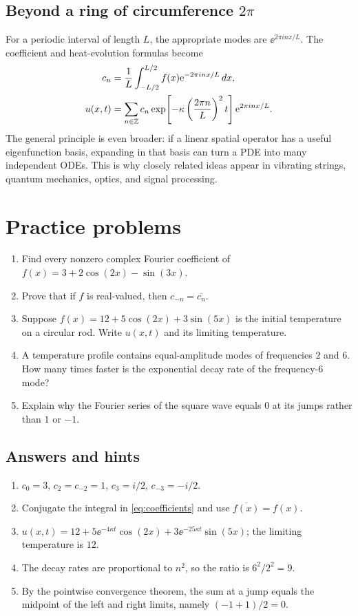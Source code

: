 \subsection{Beyond a ring of circumference \texorpdfstring{$2\pi$}{2 pi}}
For a periodic interval of length $L$, the appropriate modes are
$\ee^{2\pi inx/L}$. The coefficient and heat-evolution formulas become
\begin{align*}
 c_n&=\frac1L\int_{-L/2}^{L/2}
 f(x)\mathrm{e}^{-2\pi inx/L}\,dx,\\
 u(x,t)&=\sum_{n\in\mathbb{Z}}c_n
 \exp\!\left[-\kappa\left(\frac{2\pi n}{L}\right)^2t\right]
 \mathrm{e}^{2\pi inx/L}.
\end{align*}
The general principle is even broader: if a linear spatial operator has a
useful eigenfunction basis, expanding in that basis can turn a PDE into many
independent ODEs. This is why closely related ideas appear in vibrating strings,
quantum mechanics, optics, and signal processing.


\section{Practice problems}
\begin{problem}
\leavevmode\par\smallskip
\begin{enumerate}
 \item Find every nonzero complex Fourier coefficient of
 $f(x)=3+2\cos(2x)-\sin(3x)$.
 \item Prove that if $f$ is real-valued, then $c_{-n}=\overline{c_n}$.
 \item Suppose $f(x)=12+5\cos(2x)+3\sin(5x)$ is the initial temperature
 on a circular rod. Write $u(x,t)$ and its limiting temperature.
 \item A temperature profile contains equal-amplitude modes of frequencies
 $2$ and $6$. How many times faster is the exponential decay rate of the
 frequency-$6$ mode?
 \item Explain why the Fourier series of the square wave equals $0$ at its
 jumps rather than $1$ or $-1$.
\end{enumerate}
\end{problem}

\subsection*{Answers and hints}
\begin{enumerate}
 \item $c_0=3$, $c_{2}=c_{-2}=1$, $c_3=i/2$, $c_{-3}=-i/2$.
 \item Conjugate the integral in \cref{eq:coefficients} and use
 $\overline{f(x)}=f(x)$.
 \item $u(x,t)=12+5\ee^{-4\kappa t}\cos(2x)
 +3\ee^{-25\kappa t}\sin(5x)$; the limiting temperature is $12$.
 \item The decay rates are proportional to $n^2$, so the ratio is
 $6^2/2^2=9$.
 \item By the pointwise convergence theorem, the sum at a jump equals the
 midpoint of the left and right limits, namely $(-1+1)/2=0$.
\end{enumerate}
